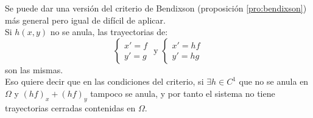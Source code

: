 \begin{obs}
    Se puede dar una versión del criterio de Bendixson (proposición \ref{pro:bendixson}) más general pero igual de difícil de aplicar.\\
    Si $h(x, y)$ no se anula, las trayectorias de:
    $$
        \begin{cases}
            x' = f\\
            y' = g
        \end{cases} \text{ y }
        \begin{cases}
            x' = hf\\
            y' = hg
        \end{cases}
    $$
    son las mismas.\\
    Eso quiere decir que en las condiciones del criterio, si $\exists h \in C^1$ que no se anula en $\Omega$ y $(hf)_x + (hf)_y$ tampoco se anula, y por tanto el sistema no tiene trayectorias cerradas contenidas en $\Omega$.
\end{obs}
